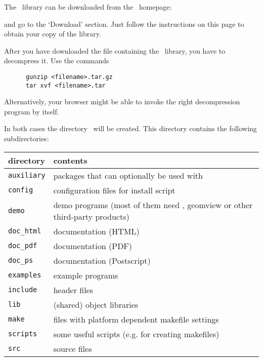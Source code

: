 The \cgal\ library can be downloaded from the \cgal\
homepage:
\begin{quote}
      \cgalhomepage
\end{quote}
and go to the `Download' section. Just follow the instructions on this
page to obtain your copy of the library.

After you have downloaded the file containing the \cgal\ library, you
have to decompress it. Use the commands

\begin{verbatim}
      gunzip <filename>.tar.gz
      tar xvf <filename>.tar
\end{verbatim}

Alternatively, your browser might be able to invoke the right
decompression program by itself.

In both cases the directory \cgaldir\ will be created. This directory
contains the following subdirectories:\index{directories!structure}

\begin{center}
  \renewcommand{\arraystretch}{1.3}
  \gdef\lcTabularBorder{2}
  \begin{tabular}{|l|l|} \hline
    \textbf{directory} & \textbf{contents}\\\hline\hline
    \texttt{auxiliary} & packages that can optionally be used with \cgal\\\hline
    \texttt{config}    & configuration files for install script\\\hline
    \texttt{demo}      & demo programs (most of them need \qt, geomview
                         or other third-party products)\\\hline
    \texttt{doc\_html} & documentation (HTML)\\\hline
    \texttt{doc\_pdf}  & documentation (PDF)\\\hline
    \texttt{doc\_ps}   & documentation (Postscript)\\\hline
    \texttt{examples}  & example programs\\\hline
    \texttt{include}   & header files\\\hline
    \texttt{lib}       & (shared) object libraries\\\hline
    \texttt{make}      & files with platform dependent makefile settings\\\hline
    \texttt{scripts}   & some useful scripts (e.g. for creating makefiles)\\\hline
    \texttt{src}       & source files\\\hline
  \end{tabular}
\end{center}

